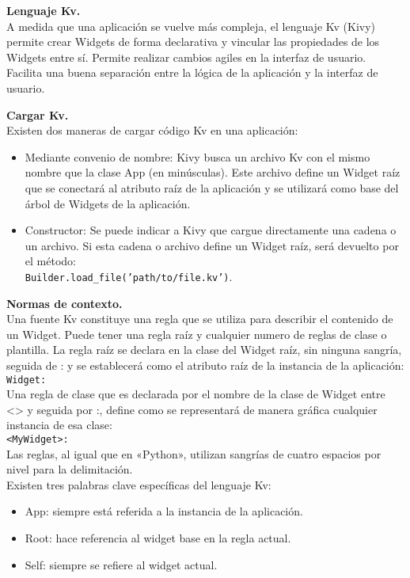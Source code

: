 \textbf{Lenguaje Kv.}\\
A medida que una aplicación se vuelve más compleja, el lenguaje Kv (Kivy) permite crear Widgets de forma declarativa y vincular las propiedades de los Widgets entre sí. Permite realizar cambios agiles en la interfaz de usuario. Facilita una buena separación entre la lógica de la aplicación y la interfaz de usuario.

\textbf{Cargar Kv.}\\
Existen dos maneras de cargar código Kv en una aplicación:
\begin{itemize}
\item Mediante convenio de nombre:
Kivy busca un archivo Kv con el mismo nombre que la clase App (en minúsculas). Este archivo define un Widget raíz que se conectará al atributo raíz de la aplicación y se utilizará como base del árbol de Widgets de la aplicación.
\item Constructor: Se puede indicar a Kivy que cargue directamente una cadena o un archivo. Si esta cadena o archivo define un Widget raíz, será devuelto por el método:\\
\texttt{Builder.load\_file('path/to/file.kv')}.\\
\end{itemize}

\textbf{Normas de contexto.}\\
Una fuente Kv constituye una regla que se utiliza para describir el contenido de un Widget. Puede tener una regla raíz y cualquier numero de reglas de clase o plantilla.
La regla raíz se declara en la clase del Widget raíz, sin ninguna sangría, seguida de : y se establecerá como el atributo raíz de la instancia de la aplicación:\\
\texttt{Widget:}\\
Una regla de clase que es declarada por el nombre de la clase de Widget entre <> y seguida por :, define como se representará de manera gráfica cualquier instancia de esa clase:\\
\texttt{<MyWidget>:}\\
Las reglas, al igual que en «Python», utilizan sangrías de cuatro espacios por nivel para la delimitación.\\
Existen tres palabras clave específicas del lenguaje Kv:
\begin{itemize}
\item App: siempre está referida a la instancia de la aplicación.
\item Root: hace referencia al widget base en la regla actual.
\item Self: siempre se refiere al widget actual.
\end{itemize}

